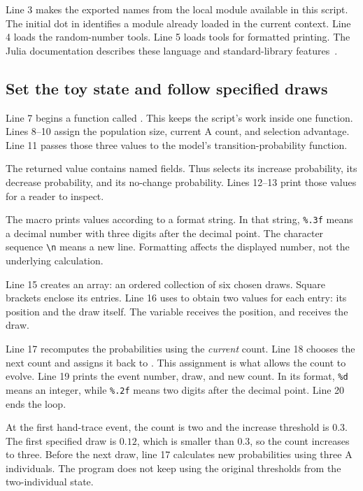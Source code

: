 Line 3 makes the exported names from the local  module
available in this script. The initial dot in  identifies
a module already loaded in the current context. Line 4 loads the random-number
tools. Line 5 loads tools for formatted printing. The Julia documentation
describes these language and standard-library features~\cite{juliadocs}.

\subsection{Set the toy state and follow specified draws}



Line 7 begins a function called . This keeps the script's work
inside one function. Lines 8--10 assign the population size, current A count,
and selection advantage. Line 11 passes those three values to the model's
transition-probability function.

The returned value contains named fields. Thus 
selects its increase probability,  its decrease
probability, and  its no-change probability.
Lines 12--13 print those values for a reader to inspect.

The macro  prints values according to a format string.
In that string, \verb|%.3f| means a decimal number with three digits after
the decimal point. The character sequence \verb|\n| means a new line.
Formatting affects the displayed number, not the underlying calculation.

Line 15 creates an array: an ordered collection of six chosen draws. Square
brackets enclose its entries. Line 16 uses  to obtain two
values for each entry: its position and the draw itself. The variable
 receives the position, and  receives the draw.

Line 17 recomputes the probabilities using the \emph{current} count.
Line 18 chooses the next count and assigns it back to . This
assignment is what allows the count to evolve. Line 19 prints the event
number, draw, and new count. In its format, \verb|%d| means an integer,
while \verb|%.2f| means two digits after the decimal point. Line 20 ends
the loop.

\begin{workedexample}
At the first hand-trace event, the count is two and the increase threshold
is \(0.3\). The first specified draw is \(0.12\), which is smaller than
\(0.3\), so the count increases to three. Before the next draw, line 17
calculates new probabilities using three A individuals. The program does
not keep using the original thresholds from the two-individual state.
\end{workedexample}

